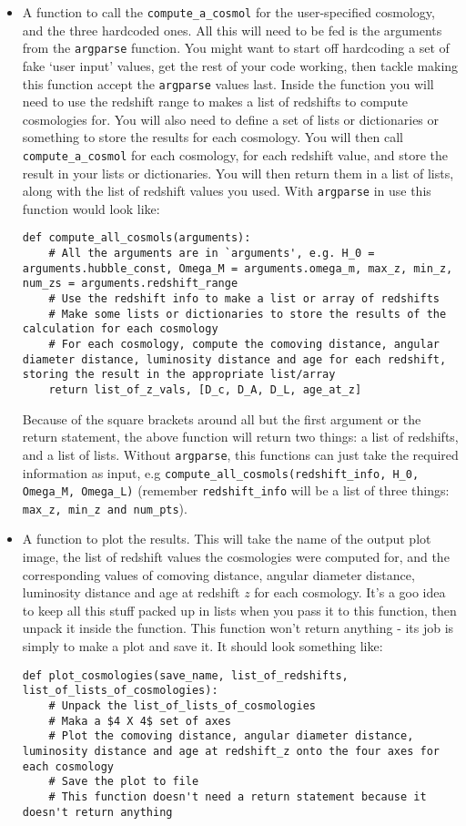 \documentclass[]{article}
\begin{document}
\begin{itemize}
\item A function to call the \texttt{compute\_a\_cosmol} for the user-specified cosmology, and the three hardcoded ones. All this will need to be fed is the arguments from the \texttt{argparse} function. You might want to start off hardcoding a set of fake `user input' values, get the rest of your code working, then tackle making this function accept the \texttt{argparse} values last. Inside the function you will need to use the redshift range to makes a list of redshifts to compute cosmologies for. You will also need to define a set of lists or dictionaries or something to store the results for each cosmology. You will then call \texttt{compute\_a\_cosmol} for each cosmology, for each redshift value, and store the result in your lists or dictionaries. You will then return them in a list of lists, along with the list of redshift values you used. With \texttt{argparse} in use this function would look like:
\begin{lstlisting}
def compute_all_cosmols(arguments):
    # All the arguments are in `arguments', e.g. H_0 = arguments.hubble_const, Omega_M = arguments.omega_m, max_z, min_z, num_zs = arguments.redshift_range
    # Use the redshift info to make a list or array of redshifts
    # Make some lists or dictionaries to store the results of the calculation for each cosmology
    # For each cosmology, compute the comoving distance, angular diameter distance, luminosity distance and age for each redshift, storing the result in the appropriate list/array
    return list_of_z_vals, [D_c, D_A, D_L, age_at_z] 
\end{lstlisting}
Because of the square brackets around all but the first argument or the return statement, the above function will return two things: a list of redshifts, and a list of lists. Without \texttt{argparse}, this functions can just take the required information as input, e.g \texttt{compute\_all\_cosmols(redshift\_info, H\_0, Omega\_M, Omega\_L)} (remember \texttt{redshift\_info} will be a list of three things: \texttt{max\_z, min\_z and num\_pts}). 

\item A function to plot the results. This will take the name of the output plot image, the list of redshift values the cosmologies were computed for, and the corresponding values of comoving distance, angular diameter distance, luminosity distance and age at redshift $z$ for each cosmology. It's a goo idea to keep all this stuff packed up in lists when you pass it to this function, then unpack it inside the function. This function won't return anything - its job is simply to make a plot and save it. It should look something like:
\begin{lstlisting}
def plot_cosmologies(save_name, list_of_redshifts, list_of_lists_of_cosmologies):
    # Unpack the list_of_lists_of_cosmologies
    # Maka a $4 X 4$ set of axes
    # Plot the comoving distance, angular diameter distance, luminosity distance and age at redshift_z onto the four axes for each cosmology
    # Save the plot to file
    # This function doesn't need a return statement because it doesn't return anything
\end{lstlisting}


\end{itemize}
\end{document}
